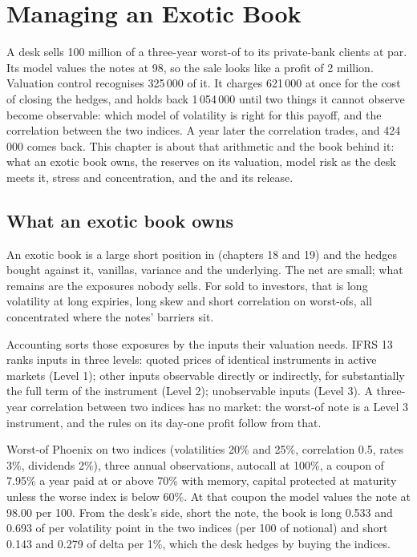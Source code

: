 \chapter{Managing an Exotic Book}\label{ch:dv:managing-an-exotic-book}

A desk sells 100 million of a three-year worst-of  to its private-bank clients at par. Its model values the notes at 98, so the sale looks
like a profit of 2 million. Valuation control recognises 325\,000 of it. It charges 621\,000 at once for the cost of closing the hedges, and holds back
1\,054\,000 until two things it cannot observe become observable: which model of volatility is right for this payoff, and the correlation between the
two indices. A year later the correlation trades, and 424\,000 comes back. This chapter is about that arithmetic and the book behind it: what an exotic
book owns, the reserves on its valuation, model risk as the desk meets it, stress and concentration, and the  and its release.

\section{What an exotic book owns}

An exotic book is a large short position in  (chapters 18 and 19) and the hedges bought against it, vanillas, variance and
the underlying. The net  are small; what remains are the exposures nobody sells. For  sold to investors, that is long volatility at long
expiries, long skew and short correlation on worst-ofs, all concentrated where the notes' barriers sit.

Accounting sorts those exposures by the inputs their valuation needs. IFRS 13 ranks inputs in three levels: quoted prices of identical instruments in
active markets (Level 1); other inputs observable directly or indirectly, for substantially the full term of the instrument (Level 2); unobservable inputs
(Level 3). A three-year correlation between two indices has no market: the worst-of note is a Level 3 instrument, and the rules on its day-one profit follow
from that.

\begin{example}\label{ex:dv:managing-an-exotic-book:note}
Worst-of Phoenix  on two indices (volatilities 20\% and 25\%, correlation 0.5, rates 3\%, dividends 2\%), three annual observations,
autocall at 100\%, a coupon of 7.95\% a year paid at or above 70\% with memory, capital protected at maturity unless the worse index is below 60\%.
At that coupon the model values the note at 98.00 per 100. From the desk's side, short the note, the book is long 0.533 and 0.693 of  per volatility
point in the two indices (per 100 of notional) and short 0.143 and 0.279 of delta per 1\%, which the desk hedges by buying the indices.
\end{example}

